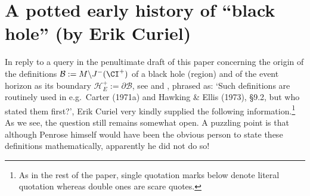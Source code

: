 \documentclass[11pt,a4paper]{article}
\newcommand{\p}{\partial}
\begin{document}
\section{A potted early history of ``black hole'' (by Erik Curiel)} 
In reply to a query in the penultimate draft of this paper concerning  the origin of the definitions $\mathcal{B}:= M\backslash J^-(\CI^+)$ of a black hole (region) and of the event horizon as its boundary $\mathcal{H}_E^+:=\p \mathcal{B}$, see 
 and , phrased as: `Such definitions are routinely used in e.g.\ Carter (1971a) and Hawking \& Ellis (1973), \S 9.2, but who stated them first?',  Erik Curiel very kindly supplied the following information.\footnote{As in the rest of the paper, single quotation marks below denote literal quotation whereas double ones are scare quotes.}  As we see, the question still remains somewhat open. A puzzling point is that
although Penrose himself would have been the obvious person to state these definitions mathematically, apparently he did not do so!
\end{document}
